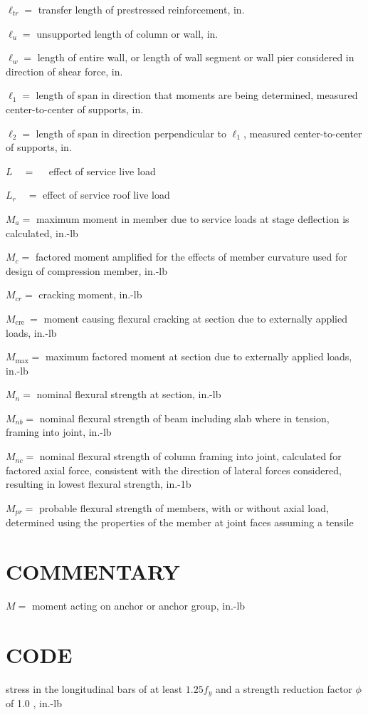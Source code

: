 \documentclass[10pt]{article}
\begin{document}
$\ell_{t r}=$ transfer length of prestressed reinforcement, in.

$\ell_{u}=$ unsupported length of column or wall, in.

$\ell_{w}=$ length of entire wall, or length of wall segment or wall pier considered in direction of shear force, in.

$\ell_{1}=$ length of span in direction that moments are being determined, measured center-to-center of supports, in.

$\ell_{2}=$ length of span in direction perpendicular to $\ell_{1}$, measured center-to-center of supports, in.

$L \quad=\quad$ effect of service live load

$L_{r} \quad=$ effect of service roof live load

$M_{a}=$ maximum moment in member due to service loads at stage deflection is calculated, in.-lb

$M_{c}=$ factored moment amplified for the effects of member curvature used for design of compression member, in.-lb

$M_{c r}=$ cracking moment, in.-lb

$M_{\text {cre }}=$ moment causing flexural cracking at section due to externally applied loads, in.-lb

$M_{\max }=$ maximum factored moment at section due to externally applied loads, in.-lb

$M_{n}=$ nominal flexural strength at section, in.-lb

$M_{n b}=$ nominal flexural strength of beam including slab where in tension, framing into joint, in.-lb

$M_{n c}=$ nominal flexural strength of column framing into joint, calculated for factored axial force, consistent with the direction of lateral forces considered, resulting in lowest flexural strength, in.-1b

$M_{p r}=$ probable flexural strength of members, with or without axial load, determined using the properties of the member at joint faces assuming a tensile

\section*{COMMENTARY}
$M=$ moment acting on anchor or anchor group, in.-lb

\section*{CODE}
stress in the longitudinal bars of at least $1.25 f_{y}$ and a strength reduction factor $\phi$ of 1.0 , in.-lb
\end{document}
